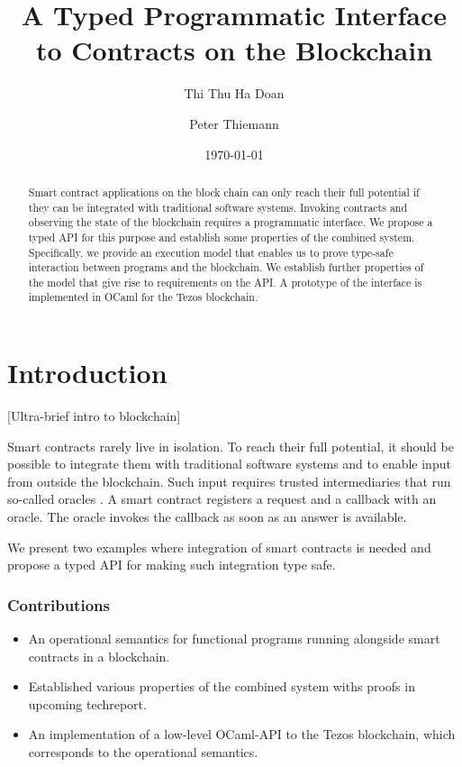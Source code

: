\documentclass[a4paper]{llncs}
\title{A Typed Programmatic Interface to Contracts on the Blockchain}
\author{Thi Thu Ha Doan\and
Peter Thiemann\orcidID{0000-0002-9000-1239}}
\institute{University of Freiburg, Germany\\
\email{\{doanha,thiemann\}@informatik.uni-freiburg.de}
}
\date{\today}
\begin{document}
\maketitle
\pagestyle{plain}
\begin{abstract}
  Smart contract applications on the block chain can only reach their full potential if
  they can be integrated with traditional software systems. Invoking
  contracts and observing the state of the blockchain requires a
  programmatic interface. We propose a typed API for this
  purpose and establish some properties of the combined
  system. Specifically, we provide an execution model that
  enables us to prove type-safe interaction between programs and the 
  blockchain. We establish further properties of the model that
  give rise to requirements on the API. A prototype of the interface
  is implemented in OCaml for the Tezos blockchain.
\end{abstract}

\section{Introduction}
\label{sec:introduction}

{[Ultra-brief intro to blockchain]}

Smart contracts rarely live in isolation. To reach their full
potential, it should be possible to integrate them with traditional
software systems and to enable input from outside the blockchain. Such
input requires trusted intermediaries that run so-called oracles \cite{oracles}. A
smart contract registers a request and a callback with an oracle. The
oracle invokes the callback as soon as an answer is available. 

We present two examples where integration of smart contracts is needed
and propose a typed API for making such integration type safe.

\subsubsection{Contributions}
\label{sec:contributions}

\begin{itemize}
\item An operational semantics for functional programs running
  alongside smart contracts in a blockchain. 
\item Established various properties of the combined system withs
  proofs in upcoming techreport.
\item An implementation of a low-level OCaml-API to the Tezos
  blockchain, which corresponds to the operational semantics.
\end{itemize}
\end{document}
